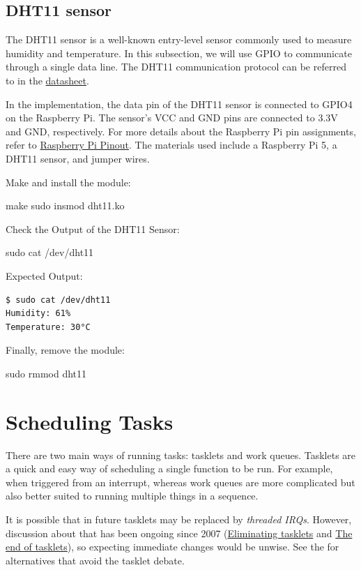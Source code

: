 \documentclass[10pt, oneside]{book}
\begin{document}
\subsection{DHT11 sensor}
\label{sec:gpio_dht11}
The DHT11 sensor is a well-known entry-level sensor commonly used to measure humidity and temperature.
In this subsection, we will use GPIO to communicate through a single data line.
The DHT11 communication protocol can be referred to in the \href{https://www.mouser.com/datasheet/2/758/DHT11-Technical-Data-Sheet-Translated-Version-1143054.pdf?srsltid=AfmBOoppls-QTd864640bVtbK90sWBsFzJ_7SgjOD2EpwuLLGUSTyYnv}{datasheet}.

In the implementation, the data pin of the DHT11 sensor is connected to GPIO4 on the Raspberry Pi.
The sensor's VCC and GND pins are connected to 3.3V and GND, respectively.
For more details about the Raspberry Pi pin assignments, refer to \href{https://pinout.xyz/}{Raspberry Pi Pinout}.
The materials used include a Raspberry Pi 5, a DHT11 sensor, and jumper wires.

Make and install the module:
\begin{codebash}
make
sudo insmod dht11.ko
\end{codebash}

Check the Output of the DHT11 Sensor:
\begin{codebash}
sudo cat /dev/dht11
\end{codebash}

Expected Output:
\begin{verbatim}
$ sudo cat /dev/dht11
Humidity: 61%
Temperature: 30°C
\end{verbatim}

Finally, remove the module:
\begin{codebash}
sudo rmmod dht11
\end{codebash}

\section{Scheduling Tasks}
\label{sec:scheduling_tasks}
There are two main ways of running tasks: tasklets and work queues.
Tasklets are a quick and easy way of scheduling a single function to be run.
For example, when triggered from an interrupt,
whereas work queues are more complicated but also better suited to running multiple things in a sequence.

It is possible that in future tasklets may be replaced by \textit{threaded IRQs}.
However, discussion about that has been ongoing since 2007 (\href{https://lwn.net/Articles/239633}{Eliminating tasklets} and \href{https://lwn.net/Articles/960041/}{The end of tasklets}),
so expecting immediate changes would be unwise.
See the  for alternatives that avoid the tasklet debate.
\end{document}
